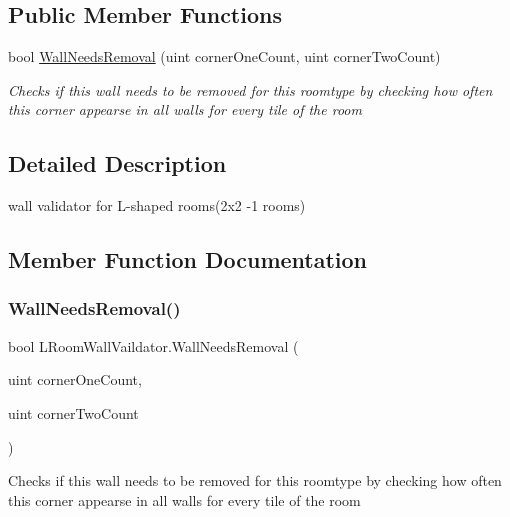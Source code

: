 \subsection*{Public Member Functions}
\begin{DoxyCompactItemize}
\item 
bool \mbox{\hyperlink{class_l_room_wall_vaildator_a1de3495c1d8cc0a4591b617d2137b497}{Wall\+Needs\+Removal}} (uint corner\+One\+Count, uint corner\+Two\+Count)
\begin{DoxyCompactList}\small\item\em Checks if this wall needs to be removed for this roomtype by checking how often this corner appearse in all walls for every tile of the room \end{DoxyCompactList}\end{DoxyCompactItemize}


\subsection{Detailed Description}
wall validator for L-\/shaped rooms(2x2 -\/1 rooms) 



\subsection{Member Function Documentation}
\mbox{\label{class_l_room_wall_vaildator_a1de3495c1d8cc0a4591b617d2137b497}} 
\subsubsection{\texorpdfstring{Wall\+Needs\+Removal()}{WallNeedsRemoval()}}
{\footnotesize\ttfamily bool L\+Room\+Wall\+Vaildator.\+Wall\+Needs\+Removal (\begin{DoxyParamCaption}\item[{uint}]{corner\+One\+Count,  }\item[{uint}]{corner\+Two\+Count }\end{DoxyParamCaption})}



Checks if this wall needs to be removed for this roomtype by checking how often this corner appearse in all walls for every tile of the room 

